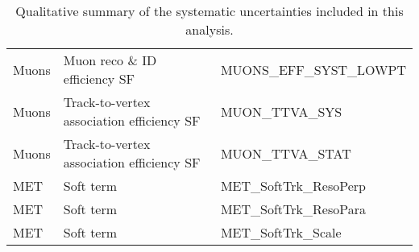 \begin{table}[!hp]
\begin{center}
\begin{tabular}{|l|l|l|}
      Muons         & Muon reco \& ID efficiency SF               &   MUONS\_EFF\_SYST\_LOWPT           \\
      Muons         & Track-to-vertex association efficiency SF         &   MUON\_TTVA\_SYS             \\
      Muons         & Track-to-vertex association efficiency SF         &   MUON\_TTVA\_STAT            \\ \hline
      MET           & Soft term                       &   MET\_SoftTrk\_ResoPerp                        \\
      MET           & Soft term                       &   MET\_SoftTrk\_ResoPara                        \\
      MET           & Soft term                       &   MET\_SoftTrk\_Scale                           \\ \hline
      \end{tabular}
      \caption{ Qualitative summary of the systematic uncertainties included in this analysis. }
      \label{tab:syst_summary_sources_2}
    \end{center}
  \end{table}
  
